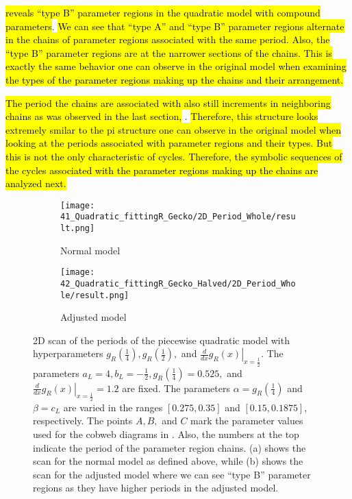  \hl{reveals ``type B'' parameter regions in the quadratic model with compound parameters}.
\hl{
	We can see that ``type A'' and ``type B'' parameter regions alternate in the chains of parameter regions associated with the same period.
	Also, the ``type B'' parameter regions are at the narrower sections of the chains.
	This is exactly the same behavior one can observe in the original model when examining the types of the parameter regions making up the chains and their arrangement.
}

\hl{The period the chains are associated with also still increments in neighboring chains as was observed in the last section,} .
\hl{
	Therefore, this structure looks extremely smilar to the \gls{pi} structure one can observe in the original model when looking at the periods associated with parameter regions and their types.
	But this is not the only characteristic of cycles.
	Therefore, the symbolic sequences of the cycles associated with the parameter regions making up the chains are analyzed next.
}

\begin{figure}
	\centering
	\begin{subfigure}{0.4\textwidth}
		\centering
		\texttt{[image: 41\_Quadratic\_fittingR\_Gecko/2D\_Period\_Whole/result.png]}
		\caption{Normal model}
		\label{fig:setup.quad.hyper.2.period.full}
	\end{subfigure}
	\begin{subfigure}{0.4\textwidth}
		\centering
		\texttt{[image: 42\_Quadratic\_fittingR\_Gecko\_Halved/2D\_Period\_Whole/result.png]}
		\caption{Adjusted model}
		\label{fig:setup.quad.hyper.2.period.halved}
	\end{subfigure}
	\caption[2D scan of the periods of the quadratic model with hyperparameters for different values of the fixed parameters]{
	2D scan of the periods of the piecewise quadratic model with hyperparameters $g_R\left(\frac{1}{4}\right), g_R\left(\frac{1}{2}\right),$ and $\left. \frac{d}{dx} g_R\left(x\right) \right|_{x = \frac{1}{2}}$.
	The parameters $a_L = 4, b_L = -\frac{1}{2}, g_R\left(\frac{1}{4}\right) = 0.525,$ and $\left. \frac{d}{dx} g_R\left(x\right) \right|_{x = \frac{1}{2}} = 1.2$ are fixed.
	The parameters $\alpha = g_R\left(\frac{1}{4}\right)$ and $\beta = c_L$ are varied in the ranges $[0.275, 0.35]$ and $[0.15, 0.1875]$, respectively.
	The points $A, B,$ and $C$ mark the parameter values used for the cobweb diagrams in .
	Also, the numbers at the top indicate the period of the parameter region chains.
	(a) shows the scan for the normal model as defined above, while (b) shows the scan for the adjusted model where we can see ``type B'' parameter regions as they have higher periods in the adjusted model.
	}
	\label{fig:setup.quad.hyper.2.period}
\end{figure}

